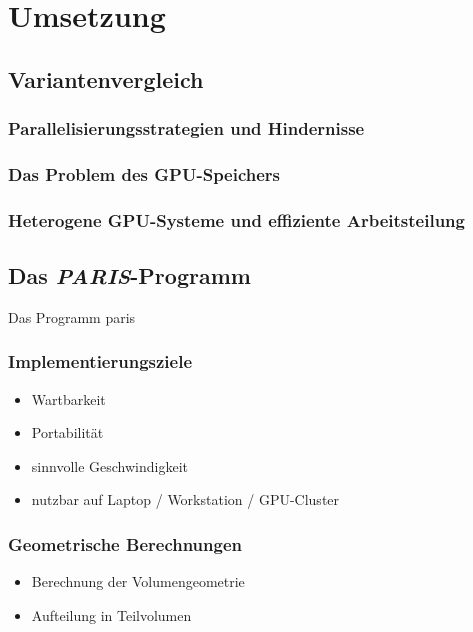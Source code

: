 \chapter{Umsetzung}

\section{Variantenvergleich}

\subsection{Parallelisierungsstrategien und Hindernisse}



\subsection{Das Problem des GPU-Speichers}

\subsection{Heterogene GPU-Systeme und effiziente Arbeitsteilung}

\section{Das \textit{PARIS}-Programm}

Das Programm \gls{paris}

\subsection{Implementierungsziele}

\begin{itemize}
    \item Wartbarkeit
    \item Portabilität
    \item sinnvolle Geschwindigkeit
    \item nutzbar auf Laptop / Workstation / GPU-Cluster
\end{itemize}

\subsection{Geometrische Berechnungen}

\begin{itemize}
    \item Berechnung der Volumengeometrie
    \item Aufteilung in Teilvolumen
\end{itemize}

